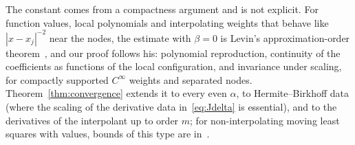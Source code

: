 \documentclass[12pt]{amsart}
\theoremstyle{definition}
\theoremstyle{remark}
\begin{document}
The constant comes from a compactness argument and is not explicit. For function values,
local polynomials and interpolating weights that behave like $|x-x_j|^{-2}$ near the nodes, the
estimate with $\beta=0$ is Levin's approximation-order theorem~\cite[Theorem~5]{Levin1998}, and
our proof follows his: polynomial reproduction, continuity of the coefficients as functions of
the local configuration, and invariance under scaling, for compactly supported $C^\infty$
weights and separated nodes. Theorem~\ref{thm:convergence} extends it to every even $\alpha$,
to Hermite--Birkhoff data (where the scaling of the derivative data in~\eqref{eq:Jdelta} is
essential), and to the derivatives of the interpolant up to order $m$; for non-interpolating
moving least squares with values, bounds of this type are
in~\cite{Wendland2001,Armentano2001,Wendland2005,Zuppa2003,Mirzaei2015}.
\end{document}
